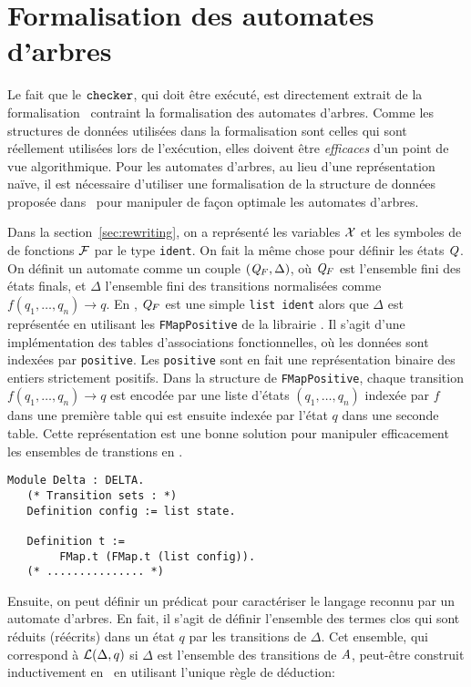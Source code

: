 \section{Formalisation des automates d'arbres}
\label{sec:automata}

Le fait que le $\mathtt{checker}$, qui doit être exécuté, est directement extrait de la formalisation \coq\
contraint la formalisation des automates d'arbres. Comme les structures de données
utilisées dans la formalisation sont celles qui sont réellement utilisées
lors de l'exécution, elles doivent être {\em efficaces} d'un point de vue algorithmique.
Pour les automates d'arbres, au lieu d'une représentation naïve, il est nécessaire d'utiliser 
une formalisation de la structure de données proposée dans~\cite{RivalGL-TPHOL01} pour manipuler de 
façon optimale les automates d'arbres.

\switchlstcoq


Dans la section~\ref{sec:rewriting}, on a représenté les variables $\mathcal X$ et les symboles de 
de fonctions $\mathcal{F}$ par le type \lstinline!ident!. On fait la même chose pour définir les états $\mathit Q$.
On définit un automate comme un couple $(\mathit Q_F, \Delta)$, où $\mathit Q_F$ est l'ensemble fini des 
états finals, et $\Delta$ l'ensemble fini des transitions normalisées comme $f(q_1, \dots, q_n) \rightarrow q$.
En \coq, $\mathit Q_F$ est une simple \lstinline!list ident! alors que $\Delta$ est représentée en utilisant les \lstinline!FMapPositive!
de la librairie \coq. Il s'agit d'une implémentation des tables d'associations fonctionnelles, où les données sont indexées par \lstinline!positive!.
Les \lstinline!positive! sont en fait une représentation binaire des entiers strictement positifs.
Dans la structure de \lstinline!FMapPositive!, chaque transition $f(q_1, \dots, q_n) \rightarrow q$ est encodée par une liste d'états $(q_1, \dots, q_n)$ indexée par $f$
dans une première table qui est ensuite indexée par l'état $q$ dans une seconde table. Cette représentation est une bonne 
solution pour manipuler efficacement les ensembles de transtions en \coq.
%
%

\begin{lstlisting}
Module Delta : DELTA.
   (* Transition sets : *)
   Definition config := list state.
   
   Definition t := 
        FMap.t (FMap.t (list config)).
   (* ............... *)
\end{lstlisting}

%
%
Ensuite, on peut définir un prédicat pour caractériser le langage reconnu par un automate d'arbres.
En fait, il s'agit de définir l'ensemble des termes clos qui sont réduits (réécrits) dans un état 
$q$ par les transitions de $\Delta$. Cet ensemble, qui correspond à $\mathcal{L}(\Delta,q)$ si $\Delta$ 
est l'ensemble des transitions de $\mathit A$, peut-être construit inductivement en \coq\ en utilisant l'unique règle de déduction:

